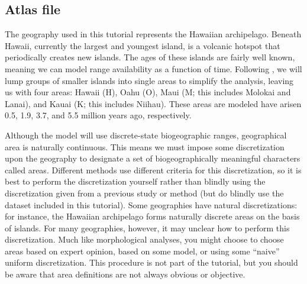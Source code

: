 \subsection{Atlas file}

The geography used in this tutorial represents the Hawaiian archipelago.
Beneath Hawaii, currently the largest and youngest island, is a volcanic hotspot that periodically creates new islands.
The ages of these islands are fairly well known, meaning we can model range availability as a function of time.
Following \citet{ree08}, we will lump groups of smaller islands into single areas to simplify the analysis, leaving us with four areas: Hawaii (H), Oahu (O), Maui (M; this includes Molokai and Lanai), and Kauai (K; this includes Niihau).
These areas are modeled have arisen 0.5, 1.9, 3.7, and 5.5 million years ago, respectively.

Although the model will use discrete-state biogeographic ranges, geographical area is naturally continuous.
This means we must impose some discretization upon the geography to designate a set of biogeographically meaningful characters called areas.
Different methods use different criteria for this discretization, so it is best to perform the discretization yourself rather than blindly using the discretization given from a previous study or method (but do blindly use the dataset included in this tutorial).
Some geographies have natural discretizations: for instance, the Hawaiian archipelago forms naturally discrete areas on the basis of islands.
For many geographies, however, it may unclear how to perform this discretization.
Much like morphological analyses, you might choose to choose areas based on expert opinion, based on some model, or using some ``naive'' uniform discretization.
This procedure is not part of the tutorial, but you should be aware that area definitions are not always obvious or objective.


\newpage


